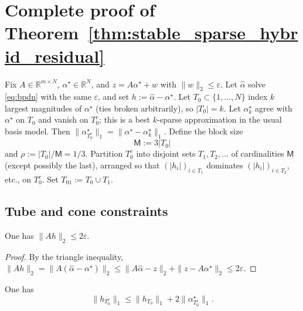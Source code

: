
\section{Complete proof of Theorem~\ref{thm:stable_sparse_hybrid_residual}}
\label{sec:appendix_bpdn_rip_proof}

Fix $A\in\mathbb{R}^{m\times N}$, $\alpha^\star\in\mathbb{R}^N$, and $z=A\alpha^\star+w$ with $\|w\|_2\le \varepsilon$.
Let $\widehat{\alpha}$ solve \eqref{eq:bpdn} with the same $\varepsilon$, and set $h:=\widehat{\alpha}-\alpha^\star$.
Let $T_0\subset\{1,\ldots,N\}$ index $k$ largest magnitudes of $\alpha^\star$ (ties broken arbitrarily), so $|T_0|=k$.
Let $\alpha^\star_k$ agree with $\alpha^\star$ on $T_0$ and vanish on $T_0^c$; this is a best $k$-sparse approximation in the usual basis model.
Then $\|\alpha^\star_{T_0^c}\|_1=\|\alpha^\star-\alpha^\star_k\|_1$.
Define the block size
\begin{equation}
  \mathsf{M} := 3|T_0|
  \label{eq:def_block_size_Msf}
\end{equation}
and $\rho := |T_0|/\mathsf{M}=1/3$.
Partition $T_0^c$ into disjoint sets $T_1,T_2,\ldots$ of cardinalities $\mathsf{M}$ (except possibly the last), arranged so that $(|h_i|)_{i\in T_1}$ dominates $(|h_i|)_{i\in T_2}$, etc., on $T_0^c$.
Set $T_{01}:=T_0\cup T_1$.

\subsection{Tube and cone constraints}

\begin{lemma}
\label{lem:appendix_tube}
One has $\|Ah\|_2\le 2\varepsilon$.
\end{lemma}

\begin{proof}
By the triangle inequality,
$\|Ah\|_2=\|A(\widehat{\alpha}-\alpha^\star)\|_2\le \|A\widehat{\alpha}-z\|_2+\|z-A\alpha^\star\|_2\le 2\varepsilon$.
\end{proof}

\begin{lemma}
\label{lem:appendix_cone_compressible}
One has
\begin{equation}
  \|h_{T_0^c}\|_1 \le \|h_{T_0}\|_1 + 2\|\alpha^\star_{T_0^c}\|_1.
  \label{eq:appendix_cone_compressible}
\end{equation}
\end{lemma}

